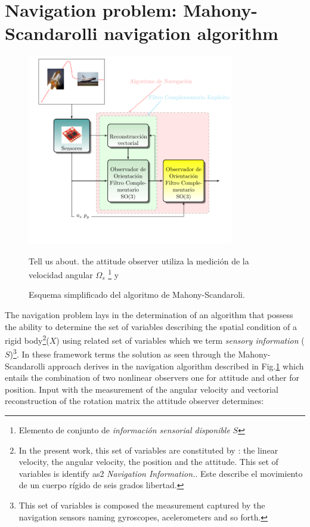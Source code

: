 \documentclass[conference]{IEEEtran}
\begin{document}
\section{Navigation problem: Mahony-Scandarolli navigation algorithm}\label{nav_problem}
\begin{figure}
\begin{center}
\includegraphics[width=9cm,clip]{intro_fig4.pdf}
\caption{Esquema simplificado del algoritmo de Mahony-Scandaroli.}
\scriptsize{Tell us about. the attitude observer utiliza la medición de la velocidad angular $\Omega_s$ \footnote{ Elemento de conjunto de \emph{información sensorial disponible} $S$} y}
\label{solucionMS_fig1}
\end{center}
\end{figure}
The navigation problem lays in the determination of an algorithm that possess the ability to determine the set of variables describing the spatial condition of a rigid body\footnote{ In the present work, this set of variables are constituted by : the linear velocity, the angular velocity, the position and the attitude. This set of variables is identify as2 \emph{Navigation Information.}. Este describe el movimiento de un cuerpo rígido de seis grados libertad.}($X$) using related set of variables which we term \emph{sensory information} ($S$)\footnote{This set of variables is composed  the measurement captured by the navigation sensors naming gyroscopes, acelerometers and so forth.}. In these framework terms the solution as seen through the Mahony-Scandarolli approach derives in the navigation algorithm described in Fig.\ref{solucionMS_fig1} which entails the combination of two nonlinear observers one for attitude and other for position.  Input with the measurement of the angular velocity and vectorial reconstruction of the rotation matrix the attitude observer determines:
\end{document}
